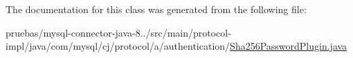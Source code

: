 The documentation for this class was generated from the following file\+:\begin{DoxyCompactItemize}
\item 
pruebas/mysql-\/connector-\/java-\/8../src/main/protocol-\/impl/java/com/mysql/cj/protocol/a/authentication/\mbox{\hyperlink{_sha256_password_plugin_8java}{Sha256\+Password\+Plugin.\+java}}\end{DoxyCompactItemize}
